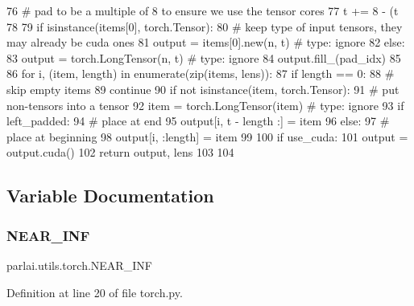 \begin{DoxyCode}
76         \textcolor{comment}{# pad to be a multiple of 8 to ensure we use the tensor cores}
77         t += 8 - (t %
78 
79     \textcolor{keywordflow}{if} isinstance(items[0], torch.Tensor):
80         \textcolor{comment}{# keep type of input tensors, they may already be cuda ones}
81         output = items[0].new(n, t)  \textcolor{comment}{# type: ignore}
82     \textcolor{keywordflow}{else}:
83         output = torch.LongTensor(n, t)  \textcolor{comment}{# type: ignore}
84     output.fill\_(pad\_idx)
85 
86     \textcolor{keywordflow}{for} i, (item, length) \textcolor{keywordflow}{in} enumerate(zip(items, lens)):
87         \textcolor{keywordflow}{if} length == 0:
88             \textcolor{comment}{# skip empty items}
89             \textcolor{keywordflow}{continue}
90         \textcolor{keywordflow}{if} \textcolor{keywordflow}{not} isinstance(item, torch.Tensor):
91             \textcolor{comment}{# put non-tensors into a tensor}
92             item = torch.LongTensor(item)  \textcolor{comment}{# type: ignore}
93         \textcolor{keywordflow}{if} left\_padded:
94             \textcolor{comment}{# place at end}
95             output[i, t - length :] = item
96         \textcolor{keywordflow}{else}:
97             \textcolor{comment}{# place at beginning}
98             output[i, :length] = item
99 
100     \textcolor{keywordflow}{if} use\_cuda:
101         output = output.cuda()
102     \textcolor{keywordflow}{return} output, lens
103 
104 
\end{DoxyCode}


\subsection{Variable Documentation}
\mbox{\label{namespaceparlai_1_1utils_1_1torch_ab38e7db22c2af18f6be15a319b63c489}} 
\subsubsection{\texorpdfstring{N\+E\+A\+R\+\_\+\+I\+NF}{NEAR\_INF}}
{\footnotesize\ttfamily parlai.\+utils.\+torch.\+N\+E\+A\+R\+\_\+\+I\+NF}



Definition at line 20 of file torch.\+py.

